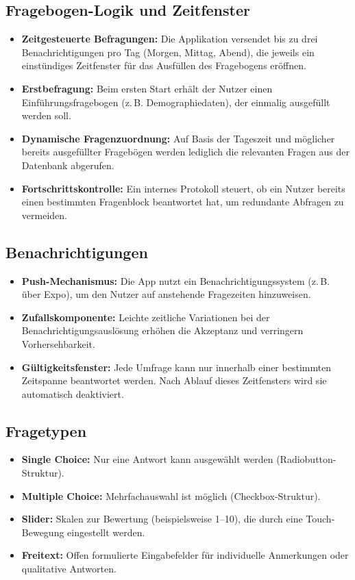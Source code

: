 \subsection{Fragebogen-Logik und Zeitfenster}
\begin{itemize}
  \item \textbf{Zeitgesteuerte Befragungen:} Die Applikation versendet bis zu drei Benachrichtigungen pro Tag (Morgen, Mittag, Abend), die jeweils ein einstündiges Zeitfenster für das Ausfüllen des Fragebogens eröffnen.
  \item \textbf{Erstbefragung:} Beim ersten Start erhält der Nutzer einen Einführungsfragebogen (z.\,B. Demographiedaten), der einmalig ausgefüllt werden soll.
  \item \textbf{Dynamische Fragenzuordnung:} Auf Basis der Tageszeit und möglicher bereits ausgefüllter Fragebögen werden lediglich die relevanten Fragen aus der Datenbank abgerufen.
  \item \textbf{Fortschrittskontrolle:} Ein internes Protokoll steuert, ob ein Nutzer bereits einen bestimmten Fragenblock beantwortet hat, um redundante Abfragen zu vermeiden.
\end{itemize}

\subsection{Benachrichtigungen}
\begin{itemize}
  \item \textbf{Push-Mechanismus:} Die App nutzt ein Benachrichtigungssystem (z.\,B. über Expo), um den Nutzer auf anstehende Fragezeiten hinzuweisen.
  \item \textbf{Zufallskomponente:} Leichte zeitliche Variationen bei der Benachrichtigungsauslösung erhöhen die Akzeptanz und verringern Vorhersehbarkeit.
  \item \textbf{Gültigkeitsfenster:} Jede Umfrage kann nur innerhalb einer bestimmten Zeitspanne beantwortet werden. Nach Ablauf dieses Zeitfensters wird sie automatisch deaktiviert.
\end{itemize}

\subsection{Fragetypen}
\begin{itemize}
  \item \textbf{Single Choice:} Nur eine Antwort kann ausgewählt werden (Radiobutton-Struktur).
  \item \textbf{Multiple Choice:} Mehrfachauswahl ist möglich (Checkbox-Struktur).
  \item \textbf{Slider:} Skalen zur Bewertung (beispielsweise 1--10), die durch eine Touch-Bewegung eingestellt werden.
  \item \textbf{Freitext:} Offen formulierte Eingabefelder für individuelle Anmerkungen oder qualitative Antworten.
\end{itemize}

